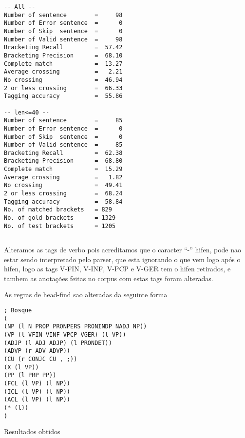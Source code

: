 \begin{verbatim}
-- All --
Number of sentence        =     98
Number of Error sentence  =      0
Number of Skip  sentence  =      0
Number of Valid sentence  =     98
Bracketing Recall         =  57.42
Bracketing Precision      =  68.10
Complete match            =  13.27
Average crossing          =   2.21
No crossing               =  46.94
2 or less crossing        =  66.33
Tagging accuracy          =  55.86

-- len<=40 --
Number of sentence        =     85
Number of Error sentence  =      0
Number of Skip  sentence  =      0
Number of Valid sentence  =     85
Bracketing Recall         =  62.38
Bracketing Precision      =  68.80
Complete match            =  15.29
Average crossing          =   1.82
No crossing               =  49.41
2 or less crossing        =  68.24
Tagging accuracy          =  58.84
No. of matched brackets   = 829
No. of gold brackets      = 1329
No. of test brackets      = 1205


\end{verbatim}


\normalsize

Alteramos as tags de verbo pois acreditamos que o caracter ``-'' hifen, pode nao estar sendo interpretado pelo parser, que esta ignorando o que vem logo após o hifen, logo as tags V-FIN, V-INF, V-PCP e V-GER tem o hifen retirados, e tambem as anotações feitas no corpus com estas tags foram alteradas.

As regras de head-find sao alteradas da seguinte forma


\scriptsize

\begin{verbatim}
; Bosque
(
(NP (l N PROP PRONPERS PRONINDP NADJ NP))
(VP (l VFIN VINF VPCP VGER) (l VP))
(ADJP (l ADJ ADJP) (l PRONDET))
(ADVP (r ADV ADVP))
(CU (r CONJC CU , ;))
(X (l VP))
(PP (l PRP PP))
(FCL (l VP) (l NP))
(ICL (l VP) (l NP))
(ACL (l VP) (l NP))
(* (l))
)

\end{verbatim}

Resultados obtidos

